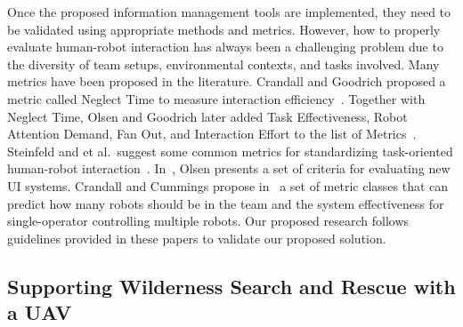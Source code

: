 
Once the proposed information management tools are implemented, they need to be validated using appropriate methods and metrics. However, how to properly evaluate human-robot interaction has always been a challenging problem due to the diversity of team setups, environmental contexts, and tasks involved. Many metrics have been proposed in the literature. Crandall and Goodrich proposed a metric called Neglect Time to measure interaction efficiency~\cite{Crandall2002Principles}. Together with Neglect Time, Olsen and Goodrich later added Task Effectiveness, Robot Attention Demand, Fan Out, and Interaction Effort to the list of Metrics~\cite{Olsen2003Metrics}. Steinfeld and et al.\ suggest some common metrics for standardizing task-oriented human-robot interaction~\cite{Steinfeld2006Common}. In~\cite{Olsen2007Evaluating}, Olsen presents a set of criteria for evaluating new UI systems. Crandall and Cummings propose in~\cite{Crandall2007Ddentifying} a set of metric classes that can predict how many robots should be in the team and the system effectiveness for single-operator controlling multiple robots.
Our proposed research follows guidelines provided in these papers to validate our proposed solution.

\subsection{Supporting Wilderness Search and Rescue with a UAV}

